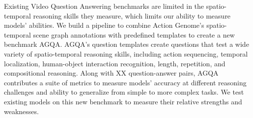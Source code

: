 Existing Video Question Answering benchmarks are limited in the spatio-temporal reasoning skills they measure, which limits our ability to measure models' abilities. We build a pipeline to combine Action Genome's spatio-temporal scene graph annotations with predefined templates to create a new benchmark AGQA. AGQA's question templates create questions that test a wide variety of spatio-temporal reasoning skills, including action sequencing, temporal localization, human-object interaction recognition, length, repetition, and compositional reasoning. Along with XX question-answer pairs, AGQA contributes a suite of metrics to measure models' accuracy at different reasoning challenges and ability to generalize from simple to more complex tasks. We test existing models on this new benchmark to measure their relative strengths and weaknesses. 